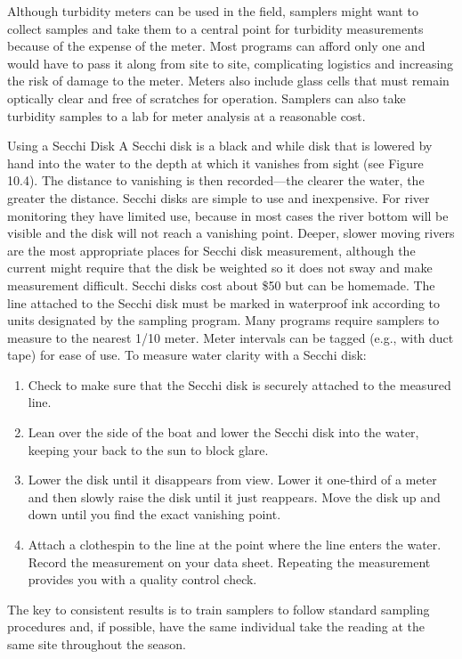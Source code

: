 \documentclass{article}
\begin{document}
Although turbidity meters can be used in the field, samplers might want
to collect samples and take them to a central point for turbidity
measurements because of the expense of the meter. Most programs can
afford only one and would have to pass it along from site to site,
complicating logistics and increasing the risk of damage to the meter.
Meters also include glass cells that must remain optically clear and
free of scratches for operation. Samplers can also take turbidity
samples to a lab for meter analysis at a reasonable cost.

Using a Secchi Disk A Secchi disk is a black and while disk that is
lowered by hand into the water to the depth at which it vanishes from
sight (see Figure 10.4). The distance to vanishing is then
recorded---the clearer the water, the greater the distance. Secchi disks
are simple to use and inexpensive. For river monitoring they have
limited use, because in most cases the river bottom will be visible and
the disk will not reach a vanishing point. Deeper, slower moving rivers
are the most appropriate places for Secchi disk measurement, although
the current might require that the disk be weighted so it does not sway
and make measurement difficult. Secchi disks cost about \$50 but can be
homemade. The line attached to the Secchi disk must be marked in
waterproof ink according to units designated by the sampling program.
Many programs require samplers to measure to the nearest 1/10 meter.
Meter intervals can be tagged (e.g., with duct tape) for ease of use. To
measure water clarity with a Secchi disk:

\begin{enumerate}
\item
  Check to make sure that the Secchi disk is securely attached to the
  measured line.
\item
  Lean over the side of the boat and lower the Secchi disk into the
  water, keeping your back to the sun to block glare.
\item
  Lower the disk until it disappears from view. Lower it one-third of a
  meter and then slowly raise the disk until it just reappears. Move the
  disk up and down until you find the exact vanishing point.
\item
  Attach a clothespin to the line at the point where the line enters the
  water. Record the measurement on your data sheet. Repeating the
  measurement provides you with a quality control check.
\end{enumerate}

The key to consistent results is to train samplers to follow standard
sampling procedures and, if possible, have the same individual take the
reading at the same site throughout the season.
\end{document}
